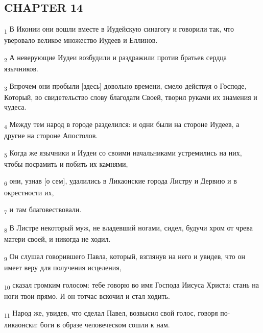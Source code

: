 \subsection{CHAPTER 14}
\begin{tcolorbox}
\textsubscript{1} В Иконии они вошли вместе в Иудейскую синагогу и говорили так, что уверовало великое множество Иудеев и Еллинов.
\end{tcolorbox}
\begin{tcolorbox}
\textsubscript{2} А неверующие Иудеи возбудили и раздражили против братьев сердца язычников.
\end{tcolorbox}
\begin{tcolorbox}
\textsubscript{3} Впрочем они пробыли [здесь] довольно времени, смело действуя о Господе, Который, во свидетельство слову благодати Своей, творил руками их знамения и чудеса.
\end{tcolorbox}
\begin{tcolorbox}
\textsubscript{4} Между тем народ в городе разделился: и одни были на стороне Иудеев, а другие на стороне Апостолов.
\end{tcolorbox}
\begin{tcolorbox}
\textsubscript{5} Когда же язычники и Иудеи со своими начальниками устремились на них, чтобы посрамить и побить их камнями,
\end{tcolorbox}
\begin{tcolorbox}
\textsubscript{6} они, узнав [о сем], удалились в Ликаонские города Листру и Дервию и в окрестности их,
\end{tcolorbox}
\begin{tcolorbox}
\textsubscript{7} и там благовествовали.
\end{tcolorbox}
\begin{tcolorbox}
\textsubscript{8} В Листре некоторый муж, не владевший ногами, сидел, будучи хром от чрева матери своей, и никогда не ходил.
\end{tcolorbox}
\begin{tcolorbox}
\textsubscript{9} Он слушал говорившего Павла, который, взглянув на него и увидев, что он имеет веру для получения исцеления,
\end{tcolorbox}
\begin{tcolorbox}
\textsubscript{10} сказал громким голосом: тебе говорю во имя Господа Иисуса Христа: стань на ноги твои прямо. И он тотчас вскочил и стал ходить.
\end{tcolorbox}
\begin{tcolorbox}
\textsubscript{11} Народ же, увидев, что сделал Павел, возвысил свой голос, говоря по-ликаонски: боги в образе человеческом сошли к нам.
\end{tcolorbox}
